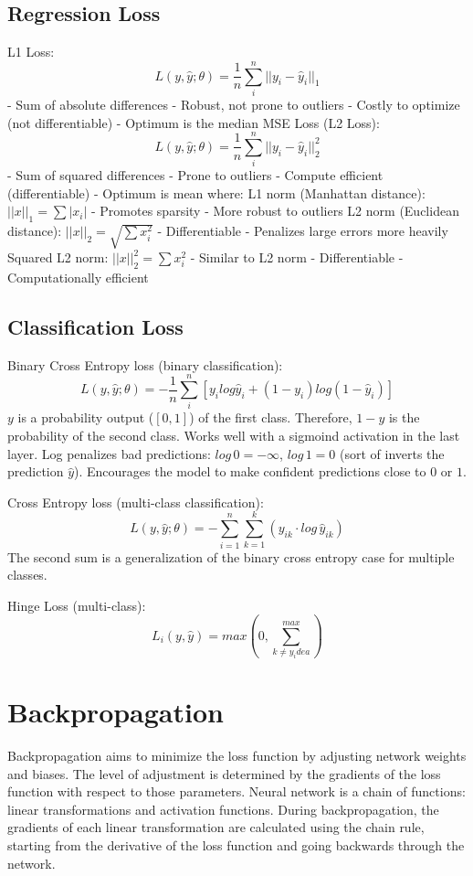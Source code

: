 \documentclass{scrartcl}
\begin{document}
\subsection*{Regression Loss}
L1 Loss:
$$L(y, \hat{y}; \theta) = \frac{1}{n} \sum_{i}^{n} ||y_i - \hat{y}_i ||_1$$
- Sum of absolute differences
- Robust, not prone to outliers
- Costly to optimize (not differentiable)
- Optimum is the median
MSE Loss (L2 Loss):
$$L(y, \hat{y}; \theta) = \frac{1}{n} \sum_{i}^{n} ||y_i - \hat{y}_i ||_2^2$$
- Sum of squared differences
- Prone to outliers
- Compute efficient (differentiable)
- Optimum is mean
where:
L1 norm (Manhattan distance): $||x||_1 = \sum |x_i|$
- Promotes sparsity
- More robust to outliers
L2 norm (Euclidean distance): $||x||_2 = \sqrt{\sum x^2_i}$
- Differentiable
- Penalizes large errors more heavily
Squared L2 norm: $||x||^2_2 = \sum x^2_i$
- Similar to L2 norm
- Differentiable
- Computationally efficient

\subsection*{Classification Loss}
Binary Cross Entropy loss (binary classification):
$$L(y, \hat{y}; \theta) = - \frac{1}{n} \sum_{i}^{n} [y_i log \hat{y}_i + (1 - y_i) log(1 - \hat{y}_i)] $$
$y$ is a probability output ($[0,1]$) of the first class. Therefore, $1 - y$ is the probability of the second class. Works well with a sigmoind activation in the last layer.
Log penalizes bad predictions: $log \, 0 = - \infty$, $log \, 1 = 0$ (sort of inverts the prediction $\hat{y}$).
Encourages the model to make confident predictions close to $0$ or $1$.

Cross Entropy loss (multi-class classification):
$$L(y, \hat{y}; \theta) = - \sum_{i=1}^{n} \sum_{k=1}^{k} (y_{ik} \cdot log \, \hat{y}_{ik})$$
The second sum is a generalization of the binary cross entropy case for multiple classes.

Hinge Loss (multi-class):
$$L_i(y, \hat{y}) = max(0, \sum_{k \neq y_idea}^{max})$$


\section*{Backpropagation}
Backpropagation aims to minimize the loss function by adjusting network weights and biases. The level of adjustment is determined by the gradients of the loss function with respect to those parameters.
Neural network is a chain of functions: linear transformations and activation functions. During backpropagation, the gradients of each linear transformation are calculated using the chain rule, starting from the derivative of the loss function and going backwards through the network.
\end{document}
